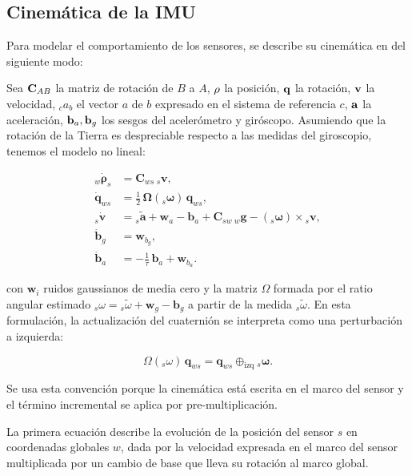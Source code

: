 \subsection{Cinemática de la IMU}

Para modelar el comportamiento de los sensores, se describe su cinemática en \cite{LeuteneggerLynenBosseSiegwartFurgale2015} del siguiente modo:

Sea $\mathbf{C}_{AB}$ la matriz de rotación de $B$ a $A$, $\mathbf{\rho}$ la posición, $\mathbf{q}$ la rotación, $\mathbf{v}$ la velocidad, ${}_ca_b$ el vector $a$ de $b$ expresado en el sistema de referencia $c$, $\mathbf{a}$ la aceleración, $\mathbf{b}_a, \mathbf{b}_g$ los sesgos del acelerómetro y giróscopo. Asumiendo que la rotación de la Tierra es despreciable respecto a las medidas del giroscopio, tenemos el modelo no lineal:

\begin{equation}
\begin{aligned}
{}_{w}\dot{\mathbf{\rho}}_{s} &= \mathbf{C}_{ws}\,{}_{s}\mathbf{v}, \\[4pt]
%
\dot{\mathbf{q}}_{ws} &= \frac{1}{2}\,\boldsymbol{\Omega}\!\left({}_{s}\boldsymbol{\omega}\right)\,\mathbf{q}_{ws}, \\[6pt]
%
{}_{s}\dot{\mathbf{v}} &=
{}_{s}\tilde{\mathbf{a}}
+ \mathbf{w}_{a}
- \mathbf{b}_{a}
+ \mathbf{C}_{sw}\,{}_{w}\mathbf{g}
- \left({}_{s}\boldsymbol{\omega}\right) \times {}_{s}\mathbf{v}, \\[6pt]
%
\dot{\mathbf{b}}_{g} &= \mathbf{w}_{b_g}, \\[4pt]
%
\dot{\mathbf{b}}_{a} &= -\frac{1}{\tau}\,\mathbf{b}_{a} + \mathbf{w}_{b_a}.
\label{imu_formula}
\end{aligned}
\end{equation}


\noindent con $\mathbf{w}_i$ ruidos gaussianos de media cero y la matriz $\Omega$ formada por el ratio angular estimado ${}_s\omega = {}_s\tilde{\omega} + \mathbf{w}_g - \mathbf{b}_g$ a partir de la medida ${}_s\tilde{\omega}$. En esta formulación, la actualización del cuaternión se interpreta como una perturbación a izquierda:

\[
\Omega({}_s\omega)\,\mathbf{q}_{ws} = \mathbf{q}_{ws} \oplus_{\mathrm{izq}} {}_s\boldsymbol{\omega}.
\]

Se usa esta convención porque la cinemática está escrita en el marco del sensor y el término incremental se aplica por pre-multiplicación.

La primera ecuación describe la evolución de la posición del sensor $s$ en coordenadas globales $w$, dada por la velocidad expresada en el marco del sensor multiplicada por un cambio de base que lleva su rotación al marco global.

